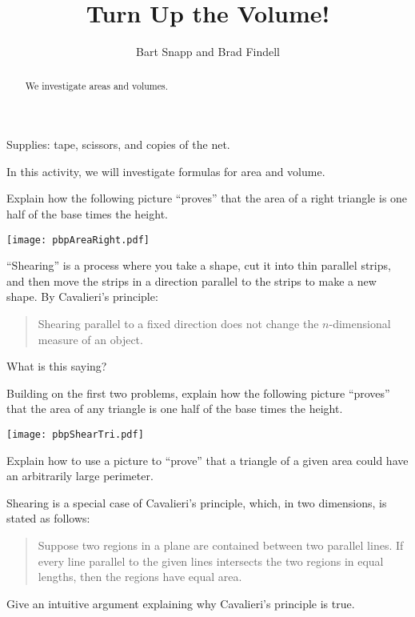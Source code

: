 \documentclass[nooutcomes]{ximera}
\title{Turn Up the Volume!}
\author{Bart Snapp and Brad Findell}
\begin{document}
\begin{abstract}
  We investigate areas and volumes.
\end{abstract}
\maketitle

\begin{teachingnote}
Supplies: tape, scissors, and copies of the net.
\end{teachingnote}
In this activity, we will investigate formulas for area and
volume.


\begin{problem}
Explain how the following picture ``proves'' that the area of a right
  triangle is one half of the base times the height.
\begin{image}
\texttt{[image: pbpAreaRight.pdf]}
\end{image}
\vfill
\end{problem}

\begin{problem}
``Shearing'' is a process where you take a shape, cut it into thin parallel strips, 
and then move the strips in a direction parallel to the strips to make a new shape.  
By Cavalieri's principle:
\begin{quote}
Shearing parallel to a fixed direction does not change the $n$-dimensional measure of an object.
\end{quote}
What is this saying?
\vfill
\end{problem}

\newpage

\begin{problem}
Building on the first two problems, explain how the following picture
  ``proves'' that the area of any triangle is one half of the base times the
  height.
\begin{image}
\texttt{[image: pbpShearTri.pdf]}
\end{image}
\vfill
\end{problem}

\begin{problem}
Explain how to use a picture to ``prove'' that a triangle of a given
  area could have an arbitrarily large perimeter.
\vfill
\end{problem}

\newpage

\begin{problem}
Shearing is a special case of Cavalieri's principle, which, in two dimensions, is stated as follows:  
\begin{quote}
Suppose two regions in a plane are contained between two parallel lines.  If every line parallel to the given lines intersects the two regions in equal lengths, then the regions have equal area.  
\end{quote}
Give an intuitive argument explaining why Cavalieri's principle is true.
\vfill
\end{problem}
\end{document}
